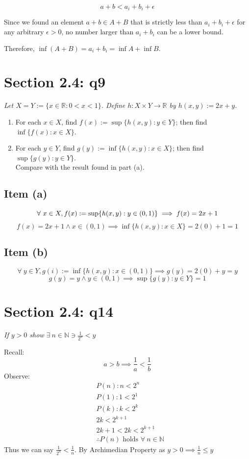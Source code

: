 \documentclass[11pt]{article}
\newcommand{\question}[1]{
    \begin{mdframed}[
        linecolor=gray,       %
        linewidth=0.5pt,      %
        innertopmargin=10pt,  %
        innerbottommargin=10pt %
    ]
    \centering \itshape \color{gray} #1
    \end{mdframed}
}
\theoremstyle{plain}
\begin{document}
$$a + b < a_i + b_i + \epsilon$$


Since we found an element $a+b \in A+B$ that is strictly less than $a_i + b_i + \epsilon$ for any arbitrary $\epsilon > 0$, no number larger than $a_i + b_i$ can be a lower bound.

Therefore, $\inf(A+B) = a_i + b_i = \inf A + \inf B$.

\section*{Section 2.4: q9}
\question{
	Let $X = Y := \{x \in \mathbb{R} : 0 < x < 1\}$. Define $h : X \times Y \to \mathbb{R}$ by $h(x,y) := 2x + y$.
	\begin{enumerate}
		\item[(a)] For each $x \in X$, find $f(x) := \sup\{h(x,y) : y \in Y\}$; then find $\inf\{f(x) : x \in X\}$.
		\item[(b)] For each $y \in Y$, find $g(y) := \inf\{h(x,y) : x \in X\}$; then find $\sup\{g(y) : y \in Y\}$. \\ Compare with the result found in part (a).
	\end{enumerate} }
\subsection*{Item (a)}
\[ \forall ~x \in X, f(x) := \sup \{ h(x,y) : y \in (0,1) \} \implies f(x) = 2x+1 \\ \]
\[ f(x) = 2x+1 \land  x \in (0,1) \implies \inf\{h(x,y) : x \in X\} = 2(0) + 1 = 1 \]
\subsection*{Item (b)}
\[ \forall ~y \in Y, g(i) := \inf\{h(x,y) : x \in (0,1)\} \implies g(y) = 2(0) + y = y \]
\[ g(y) = y \land y \in (0,1) \implies \sup\{g(y) : y \in Y\} = 1 \]
\section*{Section 2.4: q14}
\question{If $y>0$ show $\exists ~n \in \mathbb{N} \ni \frac{1}{2^n} < y$}
Recall:
\[
	a > b \implies \frac{1}{a} < \frac{1}{b}
\]
Observe:
\[
	\begin{aligned}
		 & P(n): n < 2^n                                            \\
		 & P(1): 1 < 2^1                                            \\
		 & P(k): k < 2^k                                            \\
		 & 2k < 2^{k+1}                                             \\
		 & 2k+1 < 2k < 2^{k+1}                                      \\
		 & \therefore P(n) \text{ holds } \forall ~n \in \mathbb{N}
	\end{aligned}
\]
Thus we can say $\frac{1}{2^n} < \frac{1}{n}$. By Archimedian Property as $y>0 \implies \frac{1}{n} \leq y$
\end{document}
